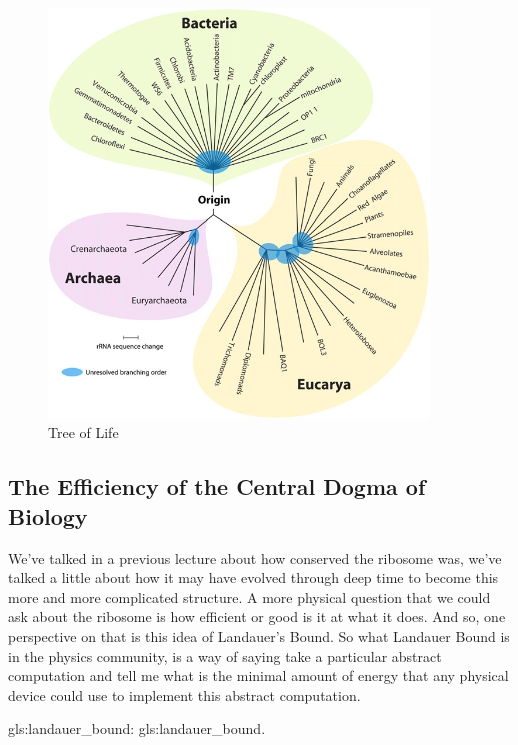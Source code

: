 \documentclass[]{article}
\begin{document}
\begin{figure}[H]
	\caption[Tree of Life]{Tree of Life\cite{nair2012woese}}\label{fig:TOL} 
	\includegraphics[width=0.9\textwidth]{TOL}
\end{figure}

\subsection{The Efficiency of the Central Dogma of Biology}

We've talked in a previous lecture about how conserved the ribosome was, we've talked a little about how it may have evolved through deep time to become this more and more complicated structure.
A more physical question that we could ask about the ribosome is how efficient or good is it at what it does. And so, one perspective on that is this idea of Landauer's Bound. So what Landauer Bound is in the physics community, is a way of saying take a particular abstract computation and tell me what is the minimal amount of energy that any physical device could use to implement this abstract computation.

\gls{gls:landauer_bound}: \glsdesc{gls:landauer_bound}. 
\end{document}
